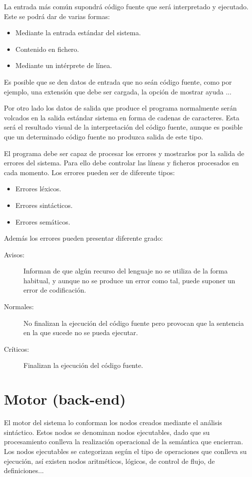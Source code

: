 La entrada más común supondrá código fuente que será interpretado y ejecutado. Este se podrá dar de varias formas:

\begin{itemize}
\item Mediante la entrada estándar del sistema.
\item Contenido en fichero.
\item Mediante un intérprete de línea.
\end{itemize}

Es posible que se den datos de entrada que no seán código fuente, como por ejemplo, una extensión que debe ser cargada, la opción de mostrar ayuda ...

Por otro lado los datos de salida que produce el programa normalmente serán volcados en la salida estándar sistema en forma de cadenas de caracteres. 
Esta será el resultado visual de la interpretación del código fuente, aunque es posible que un determinado código fuente no produzca salida de este tipo. 

El programa debe ser capaz de procesar los errores y mostrarlos por la salida de errores del sistema. Para ello debe controlar las líneas y ficheros procesados en cada
momento. Los errores pueden ser de diferente tipos:

\begin{itemize}
\item Errores léxicos.
\item Errores sintácticos.
\item Errores semáticos.
\end{itemize}

Además los errores pueden presentar diferente grado:

\begin{description}
\item [Avisos:] Informan de que algún recurso del lenguaje no se utiliza de la forma habitual, y aunque no se produce un error como tal, puede suponer un error de codificación.
\item [Normales:] No finalizan la ejecución del código fuente pero provocan que la sentencia en la que sucede no se pueda ejecutar.
\item [Críticos:] Finalizan la ejecución del código fuente.
\end{description}

\section{Motor (back-end)}
El motor del sistema lo conforman los nodos creados mediante el análisis sintáctico. Estos nodos se denominan nodos ejecutables, dado que su procesamiento conlleva la realización operacional
de la semántica que encierran. Los nodos ejecutables se categorizan según el tipo de operaciones que conlleva su ejecución, así existen nodos aritméticos, lógicos, de control de flujo, 
de definiciones... 


